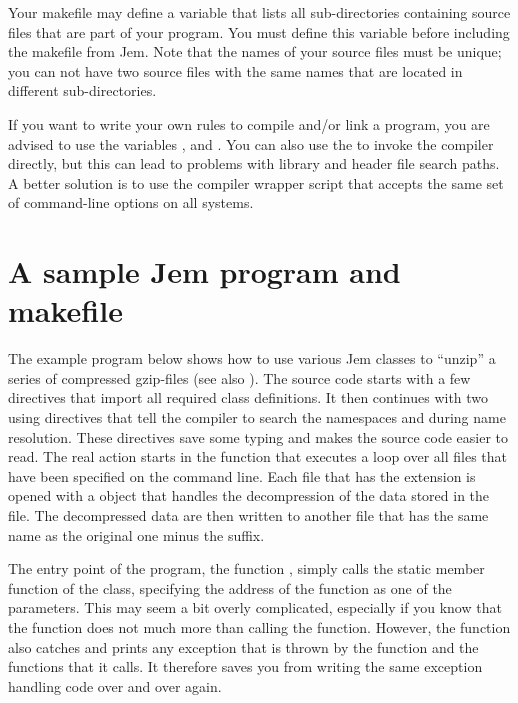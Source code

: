 \documentclass[a4paper,10pt]{article}
\begin{document}
Your makefile may define a variable  that lists all
sub-directories containing source files that are part of your program.
You must define this variable before including the makefile
 from Jem. Note that the names of your source files must
be unique; you can not have two source files with the same names that are
located in different sub-directories.

If you want to write your own rules to compile and/or link a program, you
are advised to use the variables ,  and
. You can also use the  to invoke the compiler
directly, but this can lead to problems with library and header file
search paths. A better solution is to use the compiler wrapper script
 that accepts the same set of command-line
options on all systems.


\section{A sample Jem program and makefile
  \label{section:sample-program}}

The example program  below shows how to use various Jem
classes to ``unzip'' a series of compressed gzip-files (see also
). The source code starts with a few
 directives that import all required class
definitions. It then continues with two using directives that tell the
compiler to search the namespaces  and  during
name resolution. These directives save some typing and makes the source
code easier to read. The real action starts in the function 
that executes a loop over all files that have been specified on the
command line. Each file that has the extension  is opened with
a  object that handles the decompression of the
data stored in the file. The decompressed data are then written to
another file that has the same name as the original one minus the
 suffix.


The entry point of the program, the function , simply calls
the static member function  of the  class,
specifying the address of the  function as one of the
parameters. This may seem a bit overly complicated, especially if you
know that the  function does not much more than calling the
 function. However, the  function also catches and
prints any exception that is thrown by the  function and the
functions that it calls. It therefore saves you from writing the same
exception handling code over and over again.
\end{document}
